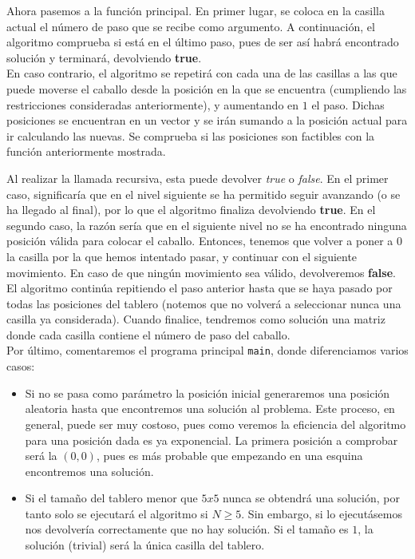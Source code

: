 \documentclass[11pt]{article}
\begin{document}
Ahora pasemos a la función principal. En primer lugar, se coloca en la casilla actual el número de paso que se recibe como argumento. A continuación, el algoritmo comprueba si está en el último paso, pues de ser así habrá encontrado solución y terminará, devolviendo \textbf{true}.\\

En caso contrario, el algoritmo se repetirá con cada una de las casillas a las que puede moverse el caballo desde la posición en la que se encuentra (cumpliendo las restricciones consideradas anteriormente), y aumentando en $1$ el paso. Dichas posiciones se encuentran en un vector y se irán sumando a la posición actual para ir calculando las nuevas. Se comprueba si las posiciones son factibles con la función anteriormente mostrada.\\

	
	\vspace{1em}


Al realizar la llamada recursiva, esta puede devolver \textit{true} o \textit{false}. En el primer caso, significaría que en el nivel siguiente se  ha permitido seguir avanzando (o se ha llegado al final), por lo que el algoritmo finaliza devolviendo \textbf{true}. En el segundo caso, la razón sería que en el siguiente nivel no se ha encontrado ninguna posición válida para colocar el caballo. Entonces, tenemos que volver a poner a $0$ la casilla por la que hemos intentado pasar, y continuar con el siguiente movimiento. En caso de que ningún movimiento sea válido, devolveremos \textbf{false}.\\

El algoritmo continúa repitiendo el paso anterior hasta que se haya pasado por todas las posiciones del tablero (notemos que no volverá a seleccionar nunca una casilla ya considerada). Cuando finalice, tendremos como solución una matriz donde cada casilla contiene el número de paso del caballo.\\




Por último, comentaremos el programa principal \verb|main|, donde diferenciamos varios casos:
\begin{itemize}
	\item Si no se pasa como parámetro la posición inicial generaremos una posición aleatoria hasta que encontremos una solución al problema. Este proceso, en general, puede ser muy costoso, pues como veremos la eficiencia del algoritmo para una posición dada es ya exponencial. La primera posición a comprobar será la $(0,0)$, pues es más probable que empezando en una esquina encontremos una solución.
	\item Si el tamaño del tablero menor que $5x5$ nunca se obtendrá una solución, por tanto solo se ejecutará el algoritmo si $N\ge5$. Sin embargo, si lo ejecutásemos nos devolvería correctamente que no hay solución. Si el tamaño es $1$, la solución (trivial) será la única casilla del tablero.
\end{itemize}
\end{document}
